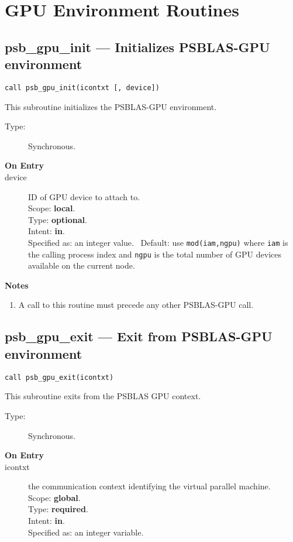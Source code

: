 
\section{GPU Environment Routines}
\label{sec:gpuenv}

\subsection*{psb\_gpu\_init --- Initializes PSBLAS-GPU
  environment}

\begin{verbatim}
call psb_gpu_init(icontxt [, device])
\end{verbatim}

This subroutine initializes the PSBLAS-GPU  environment. 
\begin{description}
\item[Type:] Synchronous.
\item[\bf  On Entry ]
\item[device] ID of GPU device to attach to.\\
Scope: {\bf local}.\\
Type: {\bf optional}.\\
Intent: {\bf in}.\\
Specified as: an integer value. \
Default: use \verb|mod(iam,ngpu)| where \verb|iam| is the calling
process index and \verb|ngpu| is the total number of GPU devices
available on the current node. 
\end{description}


{\par\noindent\large\bfseries Notes}
\begin{enumerate}
\item A call to this routine must precede any other PSBLAS-GPU call. 
\end{enumerate}

\subsection*{psb\_gpu\_exit --- Exit from  PSBLAS-GPU
  environment}

\begin{verbatim}
call psb_gpu_exit(icontxt)
\end{verbatim}

This subroutine exits from the  PSBLAS GPU context.
\begin{description}
\item[Type:] Synchronous.
\item[\bf  On Entry ]
\item[icontxt] the communication context identifying the virtual
  parallel machine.\\
Scope: {\bf global}.\\
Type: {\bf required}.\\
Intent: {\bf in}.\\
Specified as: an integer variable.
\end{description}




